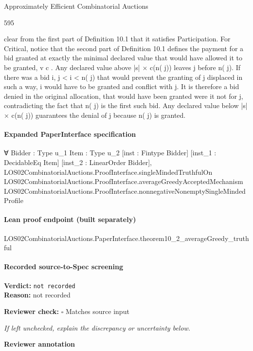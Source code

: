 \documentclass[10pt]{article}
\newcommand{\reviewerbox}{%
  \par\noindent\fbox{\parbox{0.96\linewidth}{\rule{0pt}{0.38in}}}\par
}
\newcommand{\reviewmatch}[1]{%
  \par\noindent\textbf{Reviewer check:} $\square$\; #1\par
  \noindent\emph{If left unchecked, explain the discrepancy or uncertainty below.}\par
}
\begin{document}
\begin{ReviewVerbatim}
Approximately Efficient Combinatorial Auctions

595

clear from the first part of Definition 10.1 that it satisfies Participation. For Critical,
notice that the second part of Definition 10.1 defines the payment for a bid granted
at exactly the minimal declared value that would have allowed it to be granted, v c .
Any declared value above |s| × c(n( j)) leaves j before n( j). If there was a bid i,
j < i < n( j) that would prevent the granting of j displaced in such a way, i would
have to be granted and conflict with j. It is therefore a bid denied in the original
allocation, that would have been granted were it not for j, contradicting the fact
that n( j) is the first such bid. Any declared value below |s| × c(n( j)) guarantees
the denial of j because n( j) is granted.
\end{ReviewVerbatim}


\paragraph{Expanded PaperInterface specification}
\begin{ReviewVerbatim}
∀ {Bidder : Type u_1} {Item : Type u_2} [inst : Fintype Bidder] [inst_1 : DecidableEq Item]
  [inst_2 : LinearOrder Bidder],
  LOS02CombinatorialAuctions.ProofInterface.singleMindedTruthfulOn
    LOS02CombinatorialAuctions.ProofInterface.averageGreedyAcceptedMechanism
    LOS02CombinatorialAuctions.ProofInterface.nonnegativeNonemptySingleMindedProfile
\end{ReviewVerbatim}

\paragraph{Lean proof endpoint (built separately)}\begin{ReviewVerbatim}
LOS02CombinatorialAuctions.PaperInterface.theorem10_2_averageGreedy_truthful
\end{ReviewVerbatim}

\paragraph{Recorded source-to-Spec screening}
\textbf{Verdict:} \texttt{not recorded}
\\
\textbf{Reason:} not recorded
\reviewmatch{Matches source input}
\noindent\textbf{Reviewer annotation}\par
\reviewerbox
\end{document}
